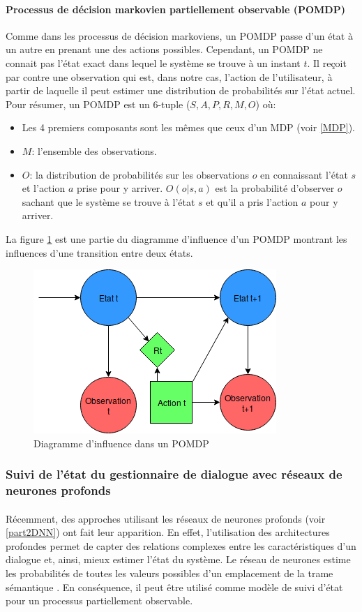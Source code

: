 \paragraph{Processus de décision markovien partiellement observable (POMDP)}
Comme dans les processus de décision markoviens, un POMDP \citep{Astrom1965} passe d'un état à un autre en prenant une des actions possibles. Cependant, un POMDP ne connait pas l'état exact dans lequel le système se trouve à un instant $t$. Il reçoit par contre une observation qui est, dans notre cas, l'action de l'utilisateur, à partir de laquelle il peut estimer une distribution de probabilités sur l'état actuel. Pour résumer, un POMDP est un 6-tuple ($S,A,P,R,M,O$) où:
\begin{itemize}
	\item Les 4 premiers composants sont les mêmes que ceux d'un MDP (voir \ref{MDP}).
	\item $M$: l'ensemble des observations.
	\item $O$: la distribution de probabilités sur les observations $o$ en connaissant l'état $s$ et l'action $a$ prise pour y arriver. $O(o|s,a)$ est la probabilité d'observer $o$ sachant que le système se trouve à l'état $s$ et qu'il a pris l'action $a$ pour y arriver.
\end{itemize}
La figure \ref{POMDP} est une partie du diagramme d'influence d'un POMDP montrant les influences d'une transition entre deux états.
\begin{figure}[H]
	\centering
	\includegraphics[width=.5\linewidth]{images/DM/POMDP.png} 
	\caption{Diagramme d'influence dans un POMDP}\label{POMDP}
\end{figure}

\subsubsection{Suivi de l'état du gestionnaire de dialogue avec réseaux de neurones profonds}
\paragraph{}
Récemment, des approches utilisant les réseaux de neurones profonds (voir \ref{part2DNN}) ont fait leur apparition. En effet, l'utilisation des architectures profondes permet de capter des relations complexes entre les caractéristiques d'un dialogue et, ainsi, mieux estimer l'état du système. Le réseau de neurones estime les probabilités de toutes les valeurs possibles d'un emplacement de la trame sémantique \citep{Henderson2013}. En conséquence, il peut être utilisé comme modèle de suivi d'état pour un processus partiellement observable.

